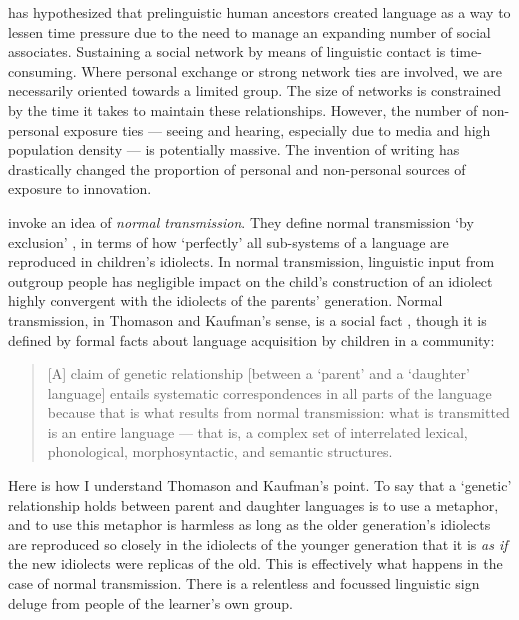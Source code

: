 \citet{dunbar_grooming_1996} has hypothesized that prelinguistic human ancestors created language as a way to lessen time pressure due to the need to manage an expanding number of social associates. Sustaining a social network by means of linguistic contact is time-consuming. Where personal exchange or strong network ties are involved, we are necessarily oriented towards a limited group. The size of networks is constrained by the time it takes to maintain these relationships. However, the number of non-personal exposure ties --- seeing and hearing, especially due to media and high population density --- is potentially massive. The invention of writing has drastically changed the proportion of personal and non-personal sources of exposure to innovation.

\citet{thomason_language_1988} invoke an idea of \textit{normal transmission}. They define normal transmission \textquoteleft by exclusion' \citep[10]{thomason_language_1988}, in terms of how \textquoteleft perfectly' all sub-systems of a language are reproduced in children's idiolects. In normal transmission, linguistic input from outgroup people has negligible impact on the child's construction of an idiolect highly convergent with the idiolects of the parents' generation. 
Normal transmission, in Thomason and Kaufman's sense, is a social fact \citep[12]{thomason_language_1988}, though it is defined by formal facts about language acquisition by children in a community:

\begin{quotation}
[A] claim of genetic relationship [between a \textquoteleft parent' and a \textquoteleft daughter' language] entails systematic correspondences in all parts of the language because that is what results from normal transmission: what is transmitted is an entire language --- that is, a complex set of interrelated lexical, phonological, morphosyntactic, and semantic structures. \citep[11]{thomason_language_1988}
\end{quotation}
	
Here is how I understand Thomason and Kaufman's point. To say that a \textquoteleft genetic' relationship holds between parent and daughter languages is to use a metaphor, and to use this metaphor is harmless as long as the older generation's idiolects are reproduced so closely in the idiolects of the younger generation that it is \textit{as if} the new idiolects were replicas of the old. This is effectively what happens in the case of normal transmission. There is a relentless and focussed linguistic sign deluge from people of the learner's own group.



